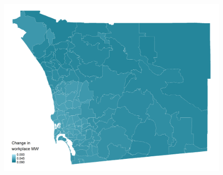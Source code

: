\documentclass[aspectratio=169, t]{beamer}
\begin{document}
\begin{frame}[label = san_diego_example]
\begin{columns}
\begin{column}{0.50\textwidth}
\begin{figure}
                \includegraphics[scale = 0.36]{maps_events/output/san_diego2018-12_wkp_mw.png}
            \end{figure}   
        \end{column}
    \end{columns}
     \hyperlink{chi_example}{}
\end{frame}
\end{document}
